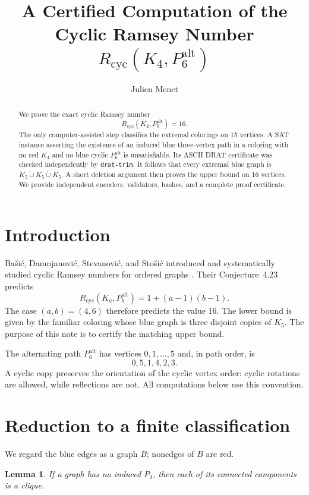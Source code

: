 \documentclass[11pt]{article}
\title{A Certified Computation of the Cyclic Ramsey Number
\texorpdfstring{$R_{\mathrm{cyc}}(K_4,P_6^{\mathrm{alt}})$}{Rcyc(K4,P6alt)}}
\author{Julien Menet}
\date{}
\newtheorem{lemma}[theorem]{Lemma}
\newcommand{\Rcyc}{R_{\mathrm{cyc}}}
\begin{document}
\maketitle

\begin{abstract}
We prove the exact cyclic Ramsey number
\[
   \Rcyc(K_4,P_6^{\mathrm{alt}})=16.
\]
The only computer-assisted step classifies the extremal colorings on 15
vertices.  A SAT instance asserting the existence of an induced blue
three-vertex path in a coloring with no red $K_4$ and no blue cyclic
$P_6^{\mathrm{alt}}$ is unsatisfiable.  Its ASCII DRAT certificate was checked
independently by \texttt{drat-trim}.  It follows that every extremal blue graph
is $K_5\mathbin{\dot\cup}K_5\mathbin{\dot\cup}K_5$.  A short deletion argument
then proves the upper bound on 16 vertices.  We provide independent encoders,
validators, hashes, and a complete proof certificate.
\end{abstract}

\section{Introduction}

Ba\v{s}i\'c, Damnjanovi\'c, Stevanovi\'c, and Sto\v{s}i\'c introduced and
systematically studied cyclic Ramsey numbers for ordered graphs
\cite{basic-et-al}.  Their Conjecture~4.23 predicts
\[
 \Rcyc(K_a,P_b^{\mathrm{alt}})=1+(a-1)(b-1).
\]
The case $(a,b)=(4,6)$ therefore predicts the value 16.  The lower bound is
given by the familiar coloring whose blue graph is three disjoint copies of
$K_5$.  The purpose of this note is to certify the matching upper bound.

The alternating path $P_6^{\mathrm{alt}}$ has vertices $0,1,\ldots,5$ and,
in path order, is
\[
 0,5,1,4,2,3.
\]
A cyclic copy preserves the orientation of the cyclic vertex order: cyclic
rotations are allowed, while reflections are not.  All computations below use
this convention.

\section{Reduction to a finite classification}

We regard the blue edges as a graph $B$; nonedges of $B$ are red.

\begin{lemma}\label{lem:p3free}
If a graph has no induced $P_3$, then each of its connected components is a
clique.
\end{lemma}
\end{document}
